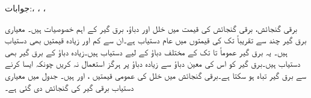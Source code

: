جوابات:، ، ، 

برقی گنجائش، برقی گنجائش  کی قیمت میں خلل اور دباؤ، برق گیر کے  اہم خصوصیات ہیں۔ معیاری برق گیر چند  سے تقریباً  تک کی قیمتوں میں عام دستیاب ہے۔ان سے کم اور زیادہ قیمتیں بھی دستیاب ہیں۔ یہ برق گیر عموماً  تا  تک کے مختلف دباؤ کے لیے دستیاب ہیں۔زیادہ دباؤ کے برق گیر بھی دستیاب ہیں۔برق گیر کو اس کی معین دباؤ سے زیادہ دباؤ پر ہرگز استعمال نہ کریں چونکہ ایسا کرنے سے  برق گیر تباہ ہو سکتا ہے۔برقی گنجائش میں خلل کی عمومی قیمتیں ،  اور  ہیں۔ جدول  میں معیاری دستیاب برقی گیر کی گنجائش دی گئی ہے۔

